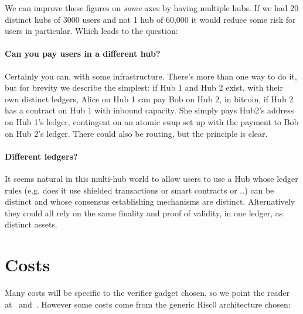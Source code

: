 \documentclass[11pt]{article}
\begin{document}
We can improve these figures on \emph{some} axes by having multiple hubs. If we had 20 distinct hubs of 3000 users and not 1 hub of 60,000 it would reduce some risk for users in particular. Which leads to the question:

\paragraph{ Can you pay users in a different hub?} Certainly you can, with some infrastructure. There's more than one way to do it, but for brevity we describe the simplest: if Hub 1 and Hub 2 exist, with their own distinct ledgers, Alice on Hub 1 can pay Bob on Hub 2, in bitcoin, if Hub 2 has a contract on Hub 1 with inbound capacity. She simply pays Hub2's address on Hub 1's ledger, contingent on an atomic swap set up with the payment to Bob on Hub 2's ledger. There could also be routing, but the principle is clear.

\paragraph{Different ledgers?} It seems natural in this multi-hub world to allow users to use a Hub whose ledger rules (e.g. does it use shielded transactions or smart contracts or ..) can be distinct and whose consensus establishing mechanisms are distinct. Alternatively they could all rely on the same finality and proof of validity, in one ledger, as distinct assets.

\section{Costs}
\label{sec:costs}

Many costs will be specific to the verifier gadget chosen, so we point the reader at~\cite{lichenbitvmx} and~\cite{lichenbabe}. However some costs come from the generic Risc0 architecture chosen:
\end{document}
